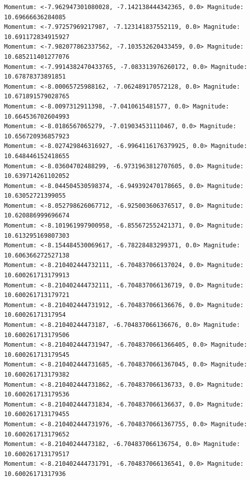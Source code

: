 \documentclass[10pt]{article}
\begin{document}
\begin{verbatim}
Momentum: <-7.962947301080028, -7.142138444342365, 0.0> Magnitude: 10.69666636284085
Momentum: <-7.97257969217987, -7.123141837552119, 0.0> Magnitude: 10.691172834915927
Momentum: <-7.982077862337562, -7.103532620433459, 0.0> Magnitude: 10.685211401277076
Momentum: <-7.9914382470433765, -7.083313976260172, 0.0> Magnitude: 10.67878373891851
Momentum: <-8.00065725988162, -7.062489170572128, 0.0> Magnitude: 10.671891579028765
Momentum: <-8.0097312911398, -7.0410615481577, 0.0> Magnitude: 10.664536702604993
Momentum: <-8.0186567065279, -7.019034531110467, 0.0> Magnitude: 10.656720936857923
Momentum: <-8.027429846316927, -6.9964116176379925, 0.0> Magnitude: 10.648446152418655
Momentum: <-8.03604702488299, -6.9731963812707605, 0.0> Magnitude: 10.639714261102052
Momentum: <-8.044504530598374, -6.949392470178665, 0.0> Magnitude: 10.63052721399055
Momentum: <-8.052798626067712, -6.925003606376517, 0.0> Magnitude: 10.620886999696674
Momentum: <-8.101961997900958, -6.855672552421371, 0.0> Magnitude: 10.613295169807303
Momentum: <-8.154484530069617, -6.78228483299371, 0.0> Magnitude: 10.606366272527138
Momentum: <-8.210402444732111, -6.704837066137024, 0.0> Magnitude: 10.600261713179913
Momentum: <-8.210402444732111, -6.704837066136719, 0.0> Magnitude: 10.600261713179721
Momentum: <-8.210402444731912, -6.704837066136676, 0.0> Magnitude: 10.60026171317954
Momentum: <-8.21040244473187, -6.704837066136676, 0.0> Magnitude: 10.600261713179506
Momentum: <-8.210402444731947, -6.7048370661366405, 0.0> Magnitude: 10.600261713179545
Momentum: <-8.210402444731685, -6.7048370661367045, 0.0> Magnitude: 10.600261713179382
Momentum: <-8.210402444731862, -6.704837066136733, 0.0> Magnitude: 10.600261713179536
Momentum: <-8.210402444731834, -6.704837066136637, 0.0> Magnitude: 10.600261713179455
Momentum: <-8.210402444731976, -6.7048370661367755, 0.0> Magnitude: 10.600261713179652
Momentum: <-8.21040244473182, -6.704837066136754, 0.0> Magnitude: 10.600261713179517
Momentum: <-8.210402444731791, -6.704837066136541, 0.0> Magnitude: 10.60026171317936
\end{verbatim}
\small
\end{document}
